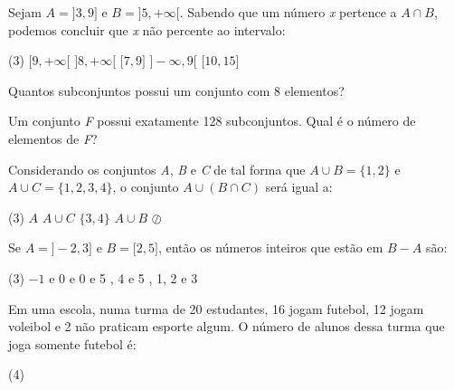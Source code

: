 \documentclass[10pt,a4paper]{article}
\begin{document}
\begin{multicols}{2}
    \begin{question}[type=exam]
      Sejam $A = \big]3,9\big]$ e $B = \big]5, +\infty\big[$. Sabendo que um número \textit{x} pertence a $A \cap B$, podemos concluir que \textit{x}
      não percente ao intervalo:

      \begin{tasks}(3)
        \task $\big[9,+\infty\big[$
        \task $\big]8,+\infty\big[$
        \task $\big[7,9\big]$
        \task $\big]-\infty,9\big[$
        \task $\big[10,15\big]$
      \end{tasks}
    \end{question}

    \begin{question}[type=exam]
      Quantos subconjuntos possui um conjunto com 8 elementos?
    \end{question}

    \begin{question}[type=exam]
      Um conjunto \textit{F} possui exatamente 128 subconjuntos. Qual é o número de elementos de \textit{F}?
    \end{question}

    \begin{question}[type=exam]
      Considerando os conjuntos \textit{A}, \textit{B} e \textit{C} de tal forma que $A \cup B = \big\{1,2\big\}$ e $A \cup C = \big\{1,2,3,4\big\}$,
      o conjunto $A \cup (B \cap C)$ será igual a: 

      \begin{tasks}(3)
        \task $A$
        \task $A \cup C$
        \task $\big\{3,4\big\}$
        \task $A \cup B$
        \task $\oslash$
      \end{tasks}
    \end{question}

    \begin{question}[type=exam]
      Se $A =\big]-2,3\big]$ e $B = \big[2,5\big]$, então os números inteiros que estão em $B - A $ são:
      \begin{tasks}(3)
        \task $-1$ e $0$
         e 0 
         e 5
        , 4 e 5
        , 1, 2 e 3
      \end{tasks}
    \end{question}

    \begin{question}[type=exam]
      Em uma escola, numa turma de 20 estudantes, 16 jogam futebol, 12 jogam voleibol e 2 não praticam esporte algum. 
      O número de alunos dessa turma que joga somente futebol é:
      \begin{tasks}(4)
      \end{tasks}
    \end{question}


\end{multicols}
\end{document}
